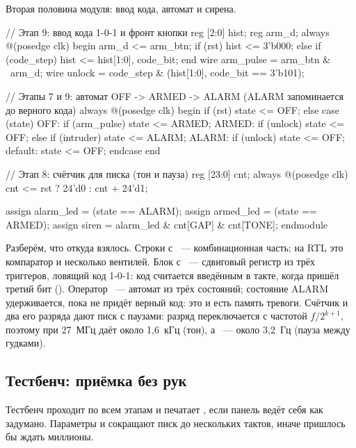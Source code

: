 Вторая половина модуля: ввод кода, автомат и сирена.

\begin{vcode}
    // Этап 9: ввод кода 1-0-1 и фронт кнопки
    reg [2:0] hist;
    reg       arm_d;
    always @(posedge clk) begin
        arm_d <= arm_btn;
        if (rst)            hist <= 3'b000;
        else if (code_step) hist <= {hist[1:0], code_bit};
    end
    wire arm_pulse = arm_btn & ~arm_d;
    wire unlock    = code_step & ({hist[1:0], code_bit} == 3'b101);

    // Этапы 7 и 9: автомат OFF -> ARMED -> ALARM (ALARM запоминается до верного кода)
    always @(posedge clk) begin
        if (rst) state <= OFF;
        else case (state)
            OFF:     if (arm_pulse) state <= ARMED;
            ARMED:   if (unlock)        state <= OFF;
                     else if (intruder) state <= ALARM;
            ALARM:   if (unlock) state <= OFF;
            default: state <= OFF;
        endcase
    end

    // Этап 8: счётчик для писка (тон и пауза)
    reg [23:0] cnt;
    always @(posedge clk) cnt <= rst ? 24'd0 : cnt + 24'd1;

    assign alarm_led = (state == ALARM);
    assign armed_led = (state == ARMED);
    assign siren     = alarm_led & cnt[GAP] & cnt[TONE];
endmodule
\end{vcode}

Разберём, что откуда взялось. Строки с ~--- комбинационная часть;
на RTL это компаратор и несколько вентилей. Блок  с
~--- сдвиговый регистр из трёх триггеров, ловящий код 1-0-1: код
считается введённым в такте, когда пришёл третий бит ().
Оператор ~--- автомат из трёх состояний; состояние ALARM
удерживается, пока не придёт верный код: это и есть память тревоги. Счётчик
 и два его разряда дают писк с паузами: разряд  переключается с
частотой $f/2^{k+1}$, поэтому при 27~МГц  даёт около 1,6~кГц
(тон), а ~--- около 3,2~Гц (пауза между гудками).

\subsection{Тестбенч: приёмка без рук}

Тестбенч проходит по всем этапам и печатает , если
панель ведёт себя как задумано. Параметры  и 
сокращают писк до нескольких тактов, иначе пришлось бы ждать миллионы.

